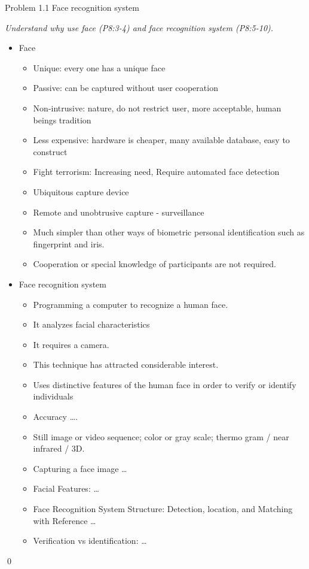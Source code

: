 \documentclass[
        ]{beamer}
\begin{document}
\begin{frame}[t]{Problem 1.1 Face recognition system}    		
	\begin{overprint}
	\emph{Understand why use face (P8:3-4) and face recognition system (P8:5-10).}
	\onslide<2> 
	\onslide<3> 
	\onslide<4> 
	\onslide<5> 
	\onslide<6> 
	\onslide<7> 
	\onslide<8> 
	\onslide<9> 
	\onslide<10>
		\begin{itemize}
		\item Face 				
			\begin{itemize}
			\item Unique: every one has a unique face
			\item Passive: can be captured without user cooperation
			\item Non-intrusive: nature, do not restrict user, more acceptable, human beings tradition
			\item Less expensive: hardware is cheaper, many available database, easy to construct
			\item Fight terrorism: Increasing need, Require automated face detection
			\item Ubiquitous capture device
			\item Remote and unobtrusive capture - surveillance
			\item Much simpler than other ways of biometric personal identification such as fingerprint and iris.
			\item Cooperation or special knowledge of participants are not required.
			\end{itemize}		
		\end{itemize}
		\begin{itemize}
		\item Face recognition system				
			\begin{itemize}
			\item Programming a computer to recognize a human face.
			\item It analyzes facial characteristics
			\item It requires a camera.
			\item This technique has attracted considerable interest.
			\item Uses distinctive features of the human face in order to verify or identify individuals
			\item Accuracy \ldots.
            \item Still image or video sequence; color or gray scale; thermo gram / near infrared / 3D.
            \item Capturing a face image \ldots
			\item Facial Features: \ldots
			\item Face Recognition System Structure: Detection, location, and Matching with Reference \ldots
			\item Verification vs identification: \ldots
			\end{itemize}		
		\end{itemize}			
	
	\qed		
	\end{overprint}
\end{frame}
\end{document}
